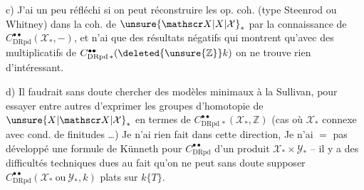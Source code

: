 c) J'ai un peu réfléchi  si on peut réconstruire les op. coh.  (type Steenrod ou Whitney) dans la coh. de $\unsure{\mathscr X|X|\mathcal X}_\ast$ par la connaissance de $C^{\bullet\bullet}_{\mathrm{DRpd}}(\mathscr X_\ast,-)$, et n'ai que des résultats  négatifs qui montrent qu'avec des  multiplicatifs de $C^{\bullet\bullet}_{\mathrm{DRpd}\,\ast}(\deleted{\unsure{\mathbb Z}}k)$ on ne trouve rien d'intéressant.

d) Il faudrait sans doute chercher des modèles minimaux à la Sullivan, pour essayer entre autres d'exprimer les  groupes d'homotopie de $\unsure{X|\mathscr X|\mathcal X}_\ast$ en termes de $C^{\bullet\bullet}_{\mathrm{DRpd}\,\ast}(\mathscr X_\ast,\mathbb Z)$ (cas où $\mathscr X_\ast$  connexe avec cond. de finitudes \ldots) Je n'ai rien fait dans cette direction, Je n'ai $=$ pas développé une formule de Künneth pour $C^{\bullet\bullet}_{\mathrm{DRpd}}$ d'un produit $\mathscr X_\ast\times\mathscr Y_\ast$ -- il y a des difficultés techniques dues au fait qu'on ne peut sans doute supposer $C^{\bullet\bullet}_{\mathrm{DRpd}}(\mathscr X_\ast\ \text{ou}\ \mathscr Y_\ast,k)$ plats sur $k\{T\}$.

